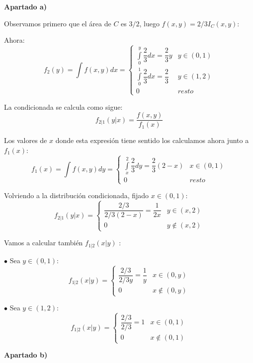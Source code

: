 \documentclass[openany]{book}
\begin{document}
\begin{exercise}
    $  $
    \begin{flushright}
        \textbf{Apartado a)}
        
    \end{flushright}
    
    Observamos primero que el área de $ C $ es $ 3/2 $, luego $ f(x,y)=2/3 I_{C}(x,y) $:
    
    Ahora:
    $$ f_{2}(y) = \int\limits_{}^{}f(x,y)dx = \left\{
    \begin{array}{ll}
        \int\limits_{0}^{y} \dfrac{2}{3}dx = \dfrac{2}{3}y & y \in (0,1)\\
        \int\limits_{0}^{1} \dfrac{2}{3}dx = \dfrac{2}{3} & y \in (1,2)\\
        0 & resto
    \end{array}
    \right. $$

    La condicionada se calcula como sigue:
    $$ f_{2|1}(y|x) = \dfrac{f(x,y)}{f_{1}(x)} $$
    
    Los valores de $ x $ donde esta expresión tiene sentido los calculamos ahora junto a $ f_{1}(x) $:
    $$ f_{1}(x) = \int\limits_{}^{}f(x,y)dy=\left\{
    \begin{array}{ll}
        \int\limits_{x}^{2}\dfrac{2}{3}dy = \dfrac{2}{3}(2-x)& x \in (0,1)\\
        0 & resto
    \end{array}
    \right. $$

    Volviendo a la distribución condicionada, fijado $ x \in (0,1) $:
    $$ f_{2|1}(y|x) = \left\{
    \begin{array}{ll}
        \dfrac{2/3}{2/3(2-x)} = \dfrac{1}{2x} & y \in (x,2)\\
        0 & y \not \in (x,2)
    \end{array}
    \right. $$

    Vamos a calcular también $ f_{1|2}(x|y) $ :

    $ \bullet   $ Sea $ y \in (0,1) $:
    $$ f_{1|2}(x|y) = \left\{
    \begin{array}{ll}
        \dfrac{2/3}{2/3y} = \dfrac{1}{y} & x \in (0,y)\\
        0 & x \not \in (0,y)
    \end{array}
    \right. $$
    
    $ \bullet   $ Sea $ y \in (1,2) $:
    $$ f_{1|2}(x|y) = \left\{
    \begin{array}{ll}
        \dfrac{2/3}{2/3} = 1 & x \in (0,1)\\
        0 & x \not \in (0,1)
    \end{array}
    \right. $$
\begin{flushright}
    \textbf{Apartado b)}
    

\end{flushright}
\end{exercise}
\end{document}
